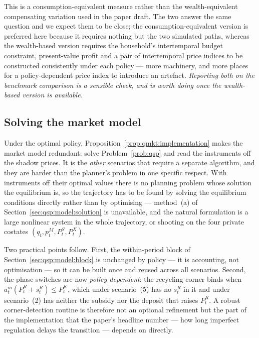 This is a consumption-equivalent measure rather than the wealth-equivalent compensating variation used
in the paper draft. The two answer the same question and we expect them to be close; the
consumption-equivalent version is preferred here because it requires nothing but the two simulated
paths, whereas the wealth-based version requires the household's intertemporal budget constraint,
present-value profit and a pair of intertemporal price indices to be constructed consistently under
each policy --- more machinery, and more places for a policy-dependent price index to introduce an
artefact. \emph{Reporting both on the benchmark comparison is a sensible check, and is worth doing once
the wealth-based version is available.}

\subsection{Solving the market model}\label{sec:qmkt:solution}

Under the optimal policy, Proposition~\ref{prop:qmkt:implementation} makes the market model redundant:
solve Problem~\ref{prob:qsp} and read the instruments off the shadow prices. It is the \emph{other}
scenarios that require a separate algorithm, and they are harder than the planner's problem in one
specific respect. With instruments off their optimal values there is no planning problem whose solution
the equilibrium is, so the trajectory has to be found by solving the equilibrium conditions directly
rather than by optimising --- method~(a) of Section~\ref{sec:qsp:model:solution} is unavailable, and
the natural formulation is a large nonlinear system in the whole trajectory, or shooting on the four
private costates $\left(q_t,p^M_t,P^S_t,P^X_t\right)$.

Two practical points follow. First, the within-period block of Section~\ref{sec:qsp:model:block} is
unchanged by policy --- it is accounting, not optimisation --- so it can be built once and reused across
all scenarios. Second, the phase switches are now \emph{policy-dependent}: the recycling corner binds
when $a^m_t\left(P^R_t+s^R_t\right)\le P^K_t$, which under scenario~(5) has no $s^R_t$ in it and under
scenario~(2) has neither the subsidy nor the deposit that raises $P^R_t$. A robust corner-detection
routine is therefore not an optional refinement but the part of the implementation that the paper's
headline number --- how long imperfect regulation delays the transition --- depends on directly.
